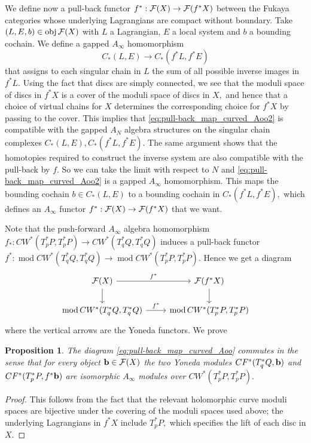 \documentclass{article}
\DeclareMathOperator{\Mod}{mod}\DeclareMathOperator{\supp}{supp}\DeclareMathOperator{\obj}{obj}
\theoremstyle{plain}%
\newtheorem{prop}[thm]{Proposition}
\theoremstyle{definition}
\numberwithin{equation}{section}
\numberwithin{figure}{section}
\def\eq{\eqref}
\def\l{\label}
\def\cF{{\mathbin{\cal F}}}
\def\iy{\infty}
\begin{document}
We define now a pull-back functor $f^*:\cF(X)\to\cF(f^*X)$ between the Fukaya categories whose underlying Lagrangians are compact without boundary. Take $(L,E,b)\in\obj \cF(X)$ with $L$ a Lagrangian, $E$ a local system and $b$ a bounding cochain. We define a gapped $A_\iy$ homomorphism 
  \begin{equation} \label{eq:pull-back_map_curved_Aoo2}
      C_*(L,E) \to   C_*(f^* L,f^* E) 
  \end{equation}
that assigns to each singular chain in $L$ the sum of all possible inverse images in $f^* L.$
Using the fact that discs are simply connected, we see that the moduli space of discs in $f^*X$ is a cover of the moduli space of discs in $X,$ and hence that a choice of virtual chains for $X$ determines the corresponding choice for $f^*X$ by passing to the cover. This implies that \eqref{eq:pull-back_map_curved_Aoo2}  is compatible with the gapped $A_N$ algebra structures on the singular chain complexes $C_*(L,E), C_*(f^*L,f^*E).$ The same argument shows that the homotopies required to construct the inverse system are also compatible with the pull-back by $f.$ So we can take the limit with respect to $N$ and \eqref{eq:pull-back_map_curved_Aoo2} is a gapped $A_\iy$ homomorphism.
This maps the bounding cochain $b\in C_*(L,E)$ to a bounding cochain in $C_*(f^* L,f^* E),$ which defines an $A_\iy$ functor $f^*:\cF(X)\to\cF(f^*X)$ that we want.

Note that the push-forward $A_\iy$ algebra homomorphism $f_*: CW^*(T_p^*P,T_p^*P)\to CW^*(T_q^*Q,T_q^*Q)$ induces a pull-back functor $f^*:\Mod CW^*(T_q^*Q,T_q^*Q)  \to \Mod CW^*(T_p^*P,T_p^*P).$ Hence we get a diagram
\begin{equation} \label{eq:pull-back_map_curved_Aoo}
\begin{tikzcd}
  \cF(X) \ar[d] \ar[r,  "f^*"]& \cF(f^*X)\ar[d]\\
   \Mod CW^*(T_q^*Q,T_q^*Q)  \ar[r,  "f^*"] & \Mod CW^*(T_p^*P,T_p^*P) 
\end{tikzcd}
\end{equation}
where the vertical arrows are the Yoneda functors. We prove
\begin{prop}\l{prop: fin cov}
The diagram \eq{eq:pull-back_map_curved_Aoo} commutes in the sense that for every object $\b\in\cF(X)$ the two Yoneda modules $CF^*(T_q^*Q,{\mathbf{b}})$ and $CF^*(T_p^*P,f^*{\mathbf{b}})$ are isomorphic $A_\iy$ modules over  $CW^*(T_p^*P,T_p^*P).$
\end{prop} 
\begin{proof}
This follows from the fact that the relevant holomorphic curve moduli spaces are bijective under the covering of the moduli spaces used above; the underlying Lagrangians in $f^*X$ include $T_p^*P,$ which specifies the lift of each disc in $X.$ 
\end{proof}
\end{document}
